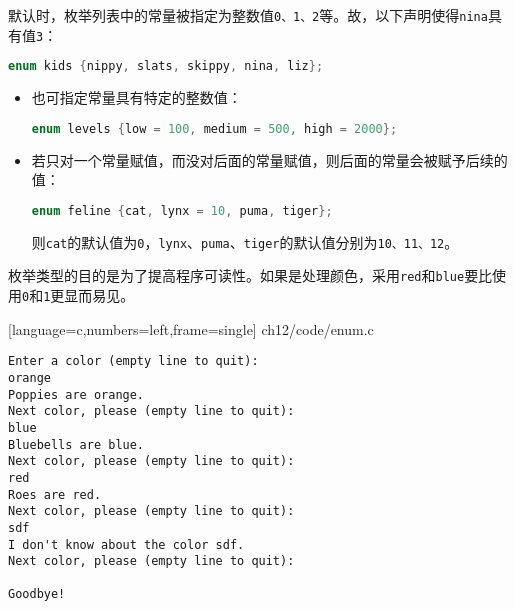 \begin{frame}[fragile]\ft{\secname}
默认时，枚举列表中的常量被指定为整数值\verb|0、1、2|等。故，以下声明使得\verb|nina|具有值\verb|3|：
  \begin{lstlisting}[language=c,backgroundcolor=\color{red!20}]
enum kids {nippy, slats, skippy, nina, liz};
  \end{lstlisting}

\end{frame}

\begin{frame}[fragile]\ft{\secname}
  \begin{itemize}
  \item 
也可指定常量具有特定的整数值：
  \begin{lstlisting}[language=c,backgroundcolor=\color{red!20}]
enum levels {low = 100, medium = 500, high = 2000};
  \end{lstlisting}
\item 若只对一个常量赋值，而没对后面的常量赋值，则后面的常量会被赋予后续的值：
  \begin{lstlisting}[language=c,backgroundcolor=\color{red!20}]
enum feline {cat, lynx = 10, puma, tiger};
  \end{lstlisting}
则\verb|cat|的默认值为\verb|0|，\verb|lynx|、\verb|puma|、\verb|tiger|的默认值分别为\verb|10、11、12|。
  \end{itemize}
\end{frame}

\begin{frame}[fragile]
枚举类型的目的是为了提高程序可读性。如果是处理颜色，采用\verb|red|和\verb|blue|要比使用\verb|0|和\verb|1|更显而易见。
\end{frame}

\begin{frame}

[language=c,numbers=left,frame=single]
{ch12/code/enum.c}
\end{frame}


\begin{frame}
  \begin{lstlisting}[backgroundcolor=\color{blue!20}]
Enter a color (empty line to quit):
orange
Poppies are orange.
Next color, please (empty line to quit): 
blue
Bluebells are blue.
Next color, please (empty line to quit): 
red
Roes are red.
Next color, please (empty line to quit): 
sdf
I don't know about the color sdf.
Next color, please (empty line to quit): 

Goodbye!
\end{lstlisting}
\end{frame}

